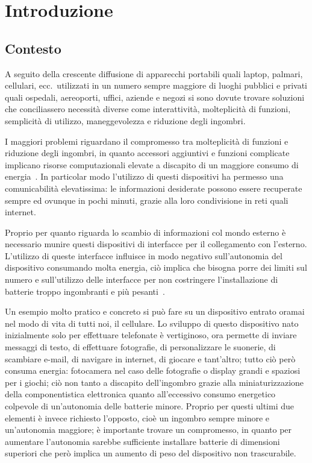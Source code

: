 \chapter{Introduzione}\label{cap:introduzione}

\section{Contesto}\label{sez:contesto}

A seguito della crescente diffusione di apparecchi portabili quali laptop, palmari, cellulari, ecc.\
utilizzati in un numero sempre maggiore di luoghi pubblici e privati quali ospedali, aereoporti, uffici,
aziende e negozi si sono dovute trovare soluzioni che conciliassero necessit\`a diverse come
interattivit\`a, molteplicit\`a di funzioni, semplicit\`a di utilizzo, maneggevolezza e riduzione degli
ingombri.

I maggiori problemi riguardano il compromesso tra molteplicit\`a di funzioni e riduzione degli ingombri, in
quanto accessori aggiuntivi e funzioni complicate implicano risorse computazionali elevate a discapito di un
maggiore consumo di energia~\cite{MathewsSicuranza}. In particolar modo l'utilizzo di questi dispositivi ha
permesso una comunicabilit\`a elevatissima: le informazioni desiderate possono essere recuperate sempre ed
ovunque in pochi minuti, grazie alla loro condivisione in reti quali internet.

Proprio per quanto riguarda lo scambio di informazioni col mondo esterno \`e necessario munire questi
dispositivi di interfacce per il collegamento con l'esterno. L'utilizzo di queste interfacce influisce in
modo negativo sull'autonomia del dispositivo consumando molta energia, ci\`o implica che bisogna porre dei
limiti sul numero e sull'utilizzo delle interfacce per non costringere l'installazione di batterie troppo
ingombranti e pi\`u pesanti~\cite{CariniMumoloSicuranza}.

Un esempio molto pratico e concreto si pu\`o fare su un dispositivo entrato oramai nel modo di vita di tutti
noi, il cellulare. Lo sviluppo di questo dispositivo nato inizialmente solo per effettuare telefonate \`e
vertiginoso, ora permette di inviare messaggi di testo, di effettuare fotografie, di personalizzare le
suonerie, di scambiare e-mail, di navigare in internet, di giocare e tant'altro; tutto ci\`o per\`o consuma
energia: fotocamera nel caso delle fotografie o display grandi e spaziosi per i giochi; ci\`o non tanto a
discapito dell'ingombro grazie alla miniaturizzazione della componentistica elettronica quanto
all'eccessivo consumo energetico colpevole di un'autonomia delle batterie minore. Proprio per questi ultimi
due elementi \`e invece richiesto l'opposto, cio\`e un ingombro sempre minore e un'autonomia maggiore; \`e
importante trovare un compromesso, in quanto per aumentare l'autonomia sarebbe sufficiente installare
batterie di dimensioni superiori che per\`o implica un aumento di peso del dispositivo non trascurabile.

